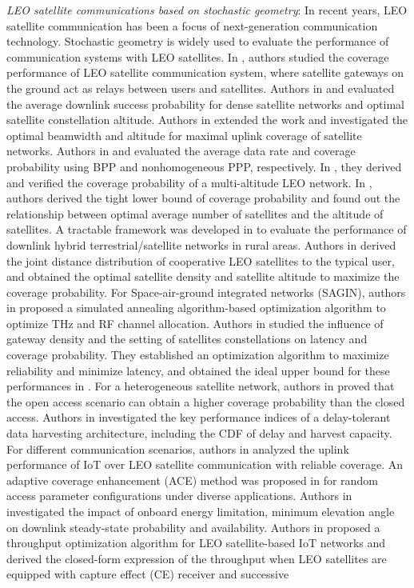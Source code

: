 \documentclass[final]{IEEEtran}
\begin{document}
\indent \textit{LEO satellite communications based on stochastic geometry}: In recent years, LEO satellite communication has been a focus of next-generation communication technology. Stochastic geometry is widely used to evaluate the performance of communication systems with LEO satellites. In \cite{talgat2020stochastic}, authors studied the coverage performance of LEO satellite communication system, where satellite gateways on the ground act as relays between users and satellites. Authors in \cite{al2021analytic} and \cite{al2021optimal} evaluated the average downlink success probability for dense satellite networks and optimal satellite constellation altitude. Authors in \cite{al2022optimal} extended the work and investigated the optimal beamwidth and altitude for maximal uplink coverage of satellite networks. Authors in \cite{okati2020downlink} and \cite{okati2022nonhomogeneous} evaluated the average data rate and coverage probability using BPP and nonhomogeneous PPP, respectively. In \cite{okati2023stochastic}, they derived and verified the coverage probability of a multi-altitude LEO network. In \cite{park2022tractable}, authors derived the tight lower bound of coverage probability and found out the relationship between optimal average number of satellites and the altitude of satellites. A tractable framework was developed in \cite{salem2023exploiting} to evaluate the performance of downlink hybrid terrestrial/satellite networks in rural areas. Authors in \cite{shang2023coverage} derived the joint distance distribution of cooperative LEO satellites to the typical user, and obtained the optimal satellite density and satellite altitude to maximize the coverage probability. For Space-air-ground integrated networks (SAGIN), authors in \cite{yuan2023joint} proposed a simulated annealing algorithm-based optimization algorithm to optimize THz and RF channel allocation. Authors in \cite{wang2022ultra} studied the influence of gateway density and the setting of satellites constellations on latency and coverage probability. They established an optimization algorithm to maximize reliability and minimize latency, and obtained the ideal upper bound for these performances in \cite{wang2024ultra}. For a heterogeneous satellite network, authors in \cite{choi2024modeling} proved that the open access scenario can obtain a higher coverage probability than the closed access. Authors in \cite{choi2024analysis} investigated the key performance indices of a delay-tolerant data harvesting architecture, including the CDF of delay and harvest capacity. For different communication scenarios, authors in \cite{talgat2024stochastic} analyzed the uplink performance of IoT over LEO satellite communication with reliable coverage. An adaptive coverage enhancement (ACE) method was proposed in \cite{hong2024narrowband} for random access parameter configurations under diverse applications. Authors in \cite{bliss2024orchestrating} investigated the impact of onboard energy limitation, minimum elevation angle on downlink steady-state probability and availability. Authors in \cite{taojoint} proposed a throughput optimization algorithm for LEO satellite-based IoT networks and derived the closed-form expression of the throughput when LEO satellites are equipped with capture effect (CE) receiver and successive 
\end{document}

